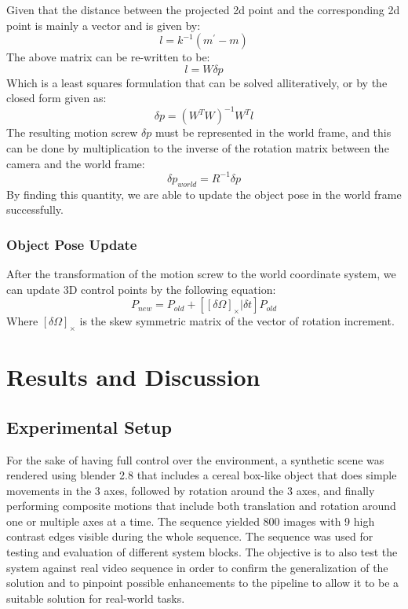 \documentclass{article}
\begin{document}
Given that the distance between the projected 2d point and the corresponding 2d point is mainly a vector and is given by:
\begin{equation}
l = k^{-1}(m^{'} - m)
\end{equation}
The above matrix can be re-written to be:
\begin{equation}
l = W \delta p
\end{equation}
Which is a least squares formulation that can be solved alliteratively, or by the closed form given as:
\begin{equation}
\delta p = (W^{T} W)^{-1} W^{T} l
\end{equation}
The resulting motion screw $\delta p$ must be represented in the world frame, and this can be done by multiplication to the inverse of the rotation matrix between the camera and the world frame:
\begin{equation}
\delta p_{world} = R^{-1} \delta p
\end{equation}
By finding this quantity, we are able to update the object pose in the world frame successfully. 
\subsubsection{Object Pose Update}
After the transformation of the motion screw to the world coordinate system, we can update 3D control points by the following equation:
\begin{equation}
P_{new} = P_{old} + [[\delta \Omega]_{\times} |\delta t] P_{old}
\end{equation}
Where $[\delta \Omega]_{\times}$ is the skew symmetric matrix of the vector of rotation increment.
\section{Results and Discussion}
\subsection{Experimental Setup}
For the sake of having full control over the environment, a synthetic scene was rendered using blender 2.8 that includes a cereal box-like object that does simple movements in the 3 axes, followed by rotation around the 3 axes, and finally performing composite motions that include both translation and rotation around one or multiple axes at a time. The sequence yielded 800 images with 9 high contrast edges visible during the whole sequence. The sequence was used for testing and evaluation of different system blocks. The objective is to also test the system against real video sequence in order to confirm the generalization of the solution and to pinpoint possible enhancements to the pipeline to allow it to be a suitable solution for real-world tasks.
\end{document}
